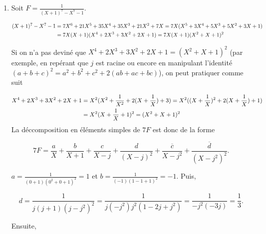 {{\begin{enumerate}
Puis, $b_3=\lim_{x\rightarrow 1}(x-1)^3\frac{91x^2-153x+70}{(x-1)^3}=8$, puis

\begin{align*}\ensuremath
\frac{91X^2-153X+70}{(X-1)^3}-\frac{8}{(X-1)^3}&=\frac{91X^2-153X+62}{(X-1)^3}=\frac{91X-62}{(X-1)^2}\\
 &=\frac{91X-91+29}{(X-1)^2}=\frac{91}{X-1}+\frac{29}{(X-1)^2}
\end{align*}

ce qui fournit $b_2=29$ et $b_1=91$.

\begin{align*}\ensuremath
F&=\frac{1}{4X}+\frac{91}{X-1}+\frac{29}{(X-1)^2}+\frac{8}{(X-1)^3}+\frac{2}{(X-1)^4}
-\frac{365+258\sqrt{2}}{8}\frac{1}{X-\sqrt{2}}+\frac{3(24+17\sqrt{2})}{16}\frac{1}{(X-\sqrt{2})^2}\\
 &-\frac{365-258\sqrt{2}}{8}\frac{1}{X+\sqrt{2}}+\frac{3(24-17\sqrt{2})}{16}\frac{1}{(X+\sqrt{2})^2}.
\end{align*}

\item  Soit $F=\frac{1}{(X+1)^7-X^7-1}$.

\begin{align*}\ensuremath
(X+1)^7-X^7-1&=7X^6+21X^5+35X^4+35X^3+21X^2+7X=7X(X^5+3X^4+5X^3+5X^2+3X+1)\\
 &=7X(X+1)(X^4+2X^3+3X^2+2X+1)=7X(X+1)(X^2+X+1)^2
\end{align*}

Si on n'a pas deviné que $X^4+2X^3+3X^2+2X+1=(X^2+X+1)^2$ (par exemple, en repérant que $j$ est racine ou encore en manipulant l'identité $(a+b+c)^2=a^2+b^2+c^2+2(ab+ac+bc)$), on peut pratiquer comme suit

\begin{align*}\ensuremath
X^4+2X^3+3X^2+2X+1&=X^2(X^2+\frac{1}{X^2}+2(X+\frac{1}{X})+3)=X^2((X+\frac{1}{X})^2+2(X+\frac{1}{X})+1)\\
 &=X^2(X+\frac{1}{X}+1)^2=(X^2+X+1)^2
\end{align*}
La déccomposition en éléments simples de $7F$ est donc de la forme

$$7F=\frac{a}{X}+\frac{b}{X+1}+\frac{c}{X-j}+\frac{d}{(X-j)^2}+\frac{\overline{c}}{X-j^2}+\frac{\overline{d}}{(X-j^2)^2}.$$

$a=\frac{1}{(0+1)(0^2+0+1)^2}=1$ et $b=\frac{1}{(-1)(1-1+1)^2}=-1$. Puis,

$$d=\frac{1}{j(j+1)(j-j^2)^2}=\frac{1}{j(-j^2)j^2(1-2j+j^2)}=\frac{1}{-j^2(-3j)}=\frac{1}{3}.$$

Ensuite, 


\end{enumerate}}}
